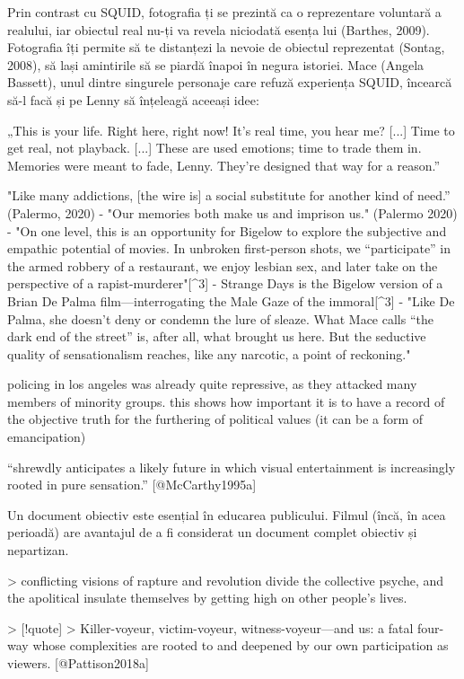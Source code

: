 \documentclass[a4paper, 12pt]{article}
\begin{document}
Prin contrast cu SQUID, fotografia ți se prezintă ca o reprezentare voluntară a realului, iar obiectul real nu-ți va revela niciodată esența lui (Barthes, 2009). Fotografia îți permite să te distanțezi la nevoie de obiectul reprezentat (Sontag, 2008), să lași amintirile să se piardă înapoi în negura istoriei. Mace (Angela Bassett), unul dintre singurele personaje care refuză experiența SQUID, încearcă să-l facă și pe Lenny să înțeleagă aceeași idee:

„This is your life. Right here, right now! It’s real time, you hear me? [...] Time to get real, not playback. [...] These are used emotions; time to trade them in. Memories were meant to fade, Lenny. They’re designed that way for a reason.”


"Like many addictions, [the wire is] a social substitute for another kind of need.” (Palermo, 2020)
- "Our memories both make us and imprison us." (Palermo 2020)
- "On one level, this is an opportunity for Bigelow to explore the subjective and empathic potential of movies. In unbroken first-person shots, we “participate” in the armed robbery of a restaurant, we enjoy lesbian sex, and later take on the perspective of a rapist-murderer"[^3]
- Strange Days is the Bigelow version of a Brian De Palma film—interrogating the Male Gaze of the immoral[^3]
- "Like De Palma, she doesn’t deny or condemn the lure of sleaze. What Mace calls “the dark end of the street” is, after all, what brought us here. But the seductive quality of sensationalism reaches, like any narcotic, a point of reckoning."

policing in los angeles was already quite repressive, as they attacked many members of minority groups. this shows how important it is to have a record of the objective truth for the furthering of political values (it can be a form of emancipation)

“shrewdly anticipates a likely future in which visual entertainment is increasingly rooted in pure sensation.” [@McCarthy1995a]

Un document obiectiv este esențial în educarea publicului. Filmul (încă, în acea perioadă) are avantajul de a fi considerat un document complet obiectiv și nepartizan.

> conflicting visions of rapture and revolution divide the collective psyche, and the apolitical insulate themselves by getting high on other people’s lives.


> [!quote]
> Killer-voyeur, victim-voyeur, witness-voyeur—and us: a fatal four-way whose complexities are rooted to and deepened by our own participation as viewers. [@Pattison2018a]
\end{document}
